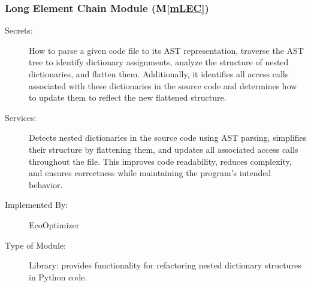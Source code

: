 \documentclass[12pt, titlepage]{article}
\newcommand{\mref}[1]{M\ref{#1}}
\begin{document}
\subsubsection{Long Element Chain Module (\mref{mLEC})}

\begin{description}
    \item[Secrets:] How to parse a given code file to its AST representation, traverse the 
    AST tree to identify dictionary assignments, analyze the structure of nested dictionaries,
     and flatten them. Additionally, it identifies all access calls associated with these dictionaries
      in the source code and determines how to update them to reflect the new flattened structure.
    \item[Services:] Detects nested dictionaries in the source code using AST parsing, simplifies their 
    structure by flattening them, and updates all associated access calls throughout the file. This improves 
    code readability, reduces complexity, and ensures correctness while maintaining the program's intended behavior.
    \item[Implemented By:] EcoOptimizer
    \item[Type of Module:] Library: provides functionality for refactoring nested dictionary structures in Python code.
\end{description}
\end{document}
